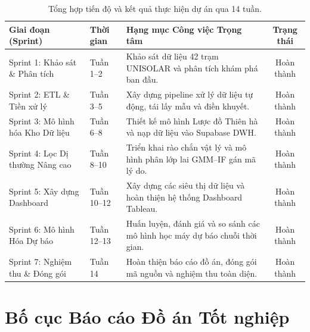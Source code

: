 \documentclass[12pt, a4paper]{report}
\begin{document}
\begin{table}[H]
\centering
\small
\renewcommand{\arraystretch}{1.25}
\begin{tabularx}{\textwidth}{@{} l l X c @{}}
\toprule
\textbf{Giai đoạn (Sprint)} & \textbf{Thời gian} & \textbf{Hạng mục Công việc Trọng tâm} & \textbf{Trạng thái} \\
\midrule
Sprint 1: Khảo sát \& Phân tích & Tuần 1--2 & Khảo sát dữ liệu 42 trạm UNISOLAR và phân tích khám phá ban đầu. & Hoàn thành \\
Sprint 2: ETL \& Tiền xử lý & Tuần 3--5 & Xây dựng pipeline xử lý dữ liệu tự động, tái lấy mẫu và điền khuyết. & Hoàn thành \\
Sprint 3: Mô hình hóa Kho Dữ liệu & Tuần 6--8 & Thiết kế mô hình Lược đồ Thiên hà và nạp dữ liệu vào Supabase DWH. & Hoàn thành \\
Sprint 4: Lọc Dị thường Nâng cao & Tuần 8--10 & Triển khai rào chắn vật lý và mô hình phân lớp lai GMM--IF gán mã lý do. & Hoàn thành \\
Sprint 5: Xây dựng Dashboard & Tuần 10--12 & Xây dựng các siêu thị dữ liệu và hoàn thiện hệ thống Dashboard Tableau. & Hoàn thành \\
Sprint 6: Mô hình Hóa Dự báo & Tuần 12--13 & Huấn luyện, đánh giá và so sánh các mô hình học máy dự báo chuỗi thời gian. & Hoàn thành \\
Sprint 7: Nghiệm thu \& Đóng gói & Tuần 14 & Hoàn thiện báo cáo đồ án, đóng gói mã nguồn và nghiệm thu toàn diện. & Hoàn thành \\
\bottomrule
\end{tabularx}
\caption{Tổng hợp tiến độ và kết quả thực hiện dự án qua 14 tuần.}
\label{tab:project_timeline}
\end{table}

\newpage
\section{Bố cục Báo cáo Đồ án Tốt nghiệp}
\label{sec:bocuc}
\end{document}
